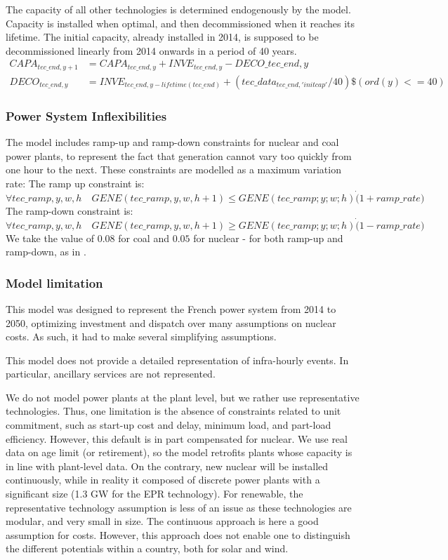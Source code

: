 The capacity of all other technologies is determined endogenously by the model. Capacity is installed when optimal, and then decommissioned when it reaches its lifetime. The initial capacity, already installed in 2014, is supposed to be decommissioned linearly from 2014 onwards in a period of 40 years.
\begin{align*}
CAPA_{tec\_end,y+1} &= CAPA_{tec\_end,y} + INVE_{tec\_end,y} - DECO\_{tec\_end,y} \\
DECO_{tec\_end,y}  &= INVE_{tec\_end,y-lifetime(tec\_end)} + (tec\_data_{tec\_end,'initcap'}/40)\$(ord(y) <= 40) 
\end{align*}



\subsubsection{Power System Inflexibilities}

The model includes ramp-up and ramp-down constraints for nuclear and coal power plants, to represent the fact that generation cannot vary too quickly from one hour to the next. These constraints are modelled as a maximum variation rate:
The ramp up constraint is:
$$\forall tec\_ramp,y,w,h \quad GENE(tec\_ramp,y,w,h+1) \leq GENE(tec\_ramp;y;w;h) \dot (1+ramp\_rate)$$
The ramp-down constraint is:
$$\forall tec\_ramp,y,w,h \quad GENE(tec\_ramp,y,w,h+1) \geq GENE(tec\_ramp;y;w;h) \dot (1-ramp\_rate)$$
We take the value of $0.08$ for coal and $0.05$ for nuclear - for both ramp-up and ramp-down, as in \citet{ADEME2015}.

\subsubsection{Model limitation}

This model was designed to represent the French power system from 2014 to 2050, optimizing investment and dispatch over many assumptions on nuclear costs. As such, it had to make several simplifying assumptions.

This model does not provide a detailed representation of infra-hourly events. In particular, ancillary services are not represented. 

We do not model power plants at the plant level, but we rather use representative technologies. Thus, one limitation is the absence of constraints related to unit commitment, such as start-up cost and delay, minimum load, and part-load efficiency. 
However, this default is in part compensated for nuclear. We use real data on age limit (or retirement), so the model retrofits plants whose capacity is in line with plant-level data. On the contrary, new nuclear will be installed continuously, while in reality it composed of discrete power plants with a significant size (1.3 GW for the EPR technology).
For renewable, the representative technology assumption is less of an issue as these technologies are modular, and very small in size. The continuous approach is here a good assumption for costs. However, this approach does not enable one to distinguish the different potentials within a country, both for solar and wind. 

